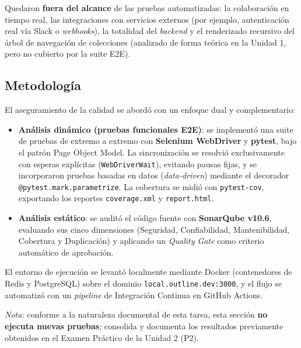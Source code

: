 \documentclass[11pt,letterpaper]{article}
\begin{document}
Quedaron \textbf{fuera del alcance} de las pruebas automatizadas: la
colaboraci\'on en tiempo real, las integraciones con servicios externos (por
ejemplo, autenticaci\'on real v\'ia Slack o \textit{webhooks}), la totalidad del
\textit{backend} y el renderizado recursivo del \'arbol de navegaci\'on de
colecciones (analizado de forma te\'orica en la Unidad 1, pero no cubierto por
la suite E2E).

\subsection*{Metodolog\'ia}

El aseguramiento de la calidad se abord\'o con un enfoque dual y complementario:

\begin{itemize}
  \item \textbf{An\'alisis din\'amico (pruebas funcionales E2E)}: se implement\'o
        una suite de pruebas de extremo a extremo con \textbf{Selenium
        WebDriver} y \textbf{pytest}, bajo el patr\'on Page Object Model. La
        sincronizaci\'on se resolvi\'o exclusivamente con esperas expl\'icitas
        (\texttt{WebDriverWait}), evitando pausas fijas, y se incorporaron
        pruebas basadas en datos (\textit{data-driven}) mediante el decorador
        \texttt{@pytest.mark.parametrize}. La cobertura se midi\'o con
        \texttt{pytest-cov}, exportando los reportes \texttt{coverage.xml} y
        \texttt{report.html}.
  \item \textbf{An\'alisis est\'atico}: se audit\'o el c\'odigo fuente con
        \textbf{SonarQube v10.6}, evaluando sus cinco dimensiones (Seguridad,
        Confiabilidad, Mantenibilidad, Cobertura y Duplicaci\'on) y aplicando un
        \textit{Quality Gate} como criterio autom\'atico de aprobaci\'on.
\end{itemize}

El entorno de ejecuci\'on se levant\'o localmente mediante Docker (contenedores
de Redis y PostgreSQL) sobre el dominio \texttt{local.outline.dev:3000}, y el
flujo se automatiz\'o con un \textit{pipeline} de Integraci\'on Continua en
GitHub Actions.

\vspace{4pt}
\noindent\textit{Nota:} conforme a la naturaleza documental de esta tarea, esta
secci\'on \textbf{no ejecuta nuevas pruebas}; consolida y documenta los
resultados previamente obtenidos en el Examen Pr\'actico de la Unidad 2 (P2).
\end{document}
